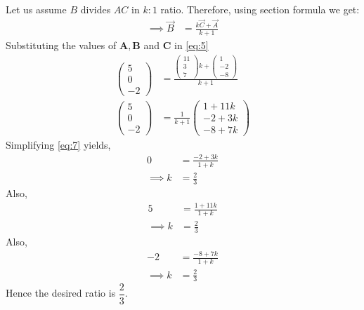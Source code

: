 \documentclass[12pt]{article}
\newcommand{\myvec}[1]{\ensuremath{\begin{pmatrix}#1\end{pmatrix}}}
\let\vec\mathbf
\begin{document}
\begin{enumerate}
Let us assume $B$ divides $AC$ in $k:1$ ratio. Therefore, using section formula we get:
\begin{align}
    \implies \Vec{B} &= \frac{k\Vec{C}+\Vec{A}}{k+1}
    \label{eq:5}
\end{align}
Substituting the values of $\vec{A},\vec{B}$ and $\vec{C}$ in \eqref{eq:5}
\begin{align}
    \myvec{5 \\ 0 \\ -2} &= \frac{\myvec{11 \\ 3 \\ 7}k + \myvec{1 \\ -2 \\ -8}}{k+1}\\
    \label{eq:6}
    \myvec{5 \\ 0 \\ -2} &=\frac{1}{k+1}\myvec{1+11k\\-2+3k\\-8+7k}
    \label{eq:7}
\end{align}
Simplifying \eqref{eq:7} yields,
\begin{align}
    0 &=\frac{-2+3k}{1+k}\\
\implies          k &=\frac{2}{3}
\end{align}
Also,
\begin{align}
          5 &=\frac{1+11k}{1+k}\\
    \implies      k &=\frac{2}{3}
\end{align}
Also,
\begin{align}
          -2 &=\frac{-8+7k}{1+k}\\
    \implies      k &=\frac{2}{3}
\end{align}
Hence the desired ratio is $\dfrac{2}{3}$. 
\end{enumerate}
\end{document}
